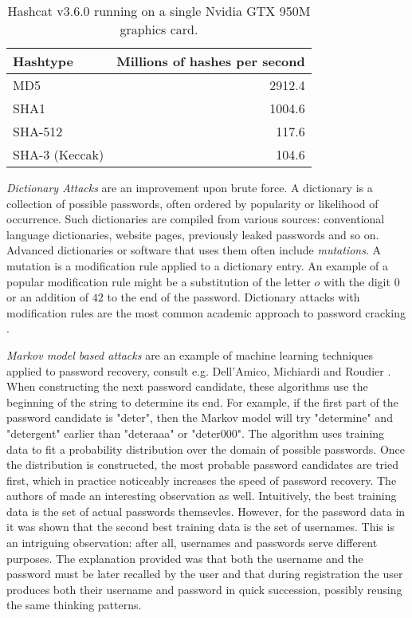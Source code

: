 \begin{table}
    \begin{center}
        \begin{tabular}{lr}
            Hashtype & Millions of hashes per second \\
            \hline
            MD5 & 2912.4 \\
            SHA1 & 1004.6 \\
            SHA-512 & 117.6 \\
            SHA-3 (Keccak) & 104.6
        \end{tabular}
    \end{center}
    \caption{Hashcat v3.6.0 running on a single Nvidia GTX 950M graphics card.}
    \label{table:hashcat-speed}
\end{table}

\emph{Dictionary Attacks} are an improvement upon brute force. A dictionary is a collection of possible passwords, often ordered by popularity or likelihood of occurrence. Such dictionaries are compiled from various sources: conventional language dictionaries, website pages, previously leaked passwords and so on. Advanced dictionaries or software that uses them often include \emph{mutations}. A mutation is a modification rule applied to a dictionary entry. An example of a popular modification rule might be a substitution of the letter \(o\) with the digit \(0\) or an addition of \(42\) to the end of the password. Dictionary attacks with modification rules are the most common academic approach to password cracking \cite{zhang2010security, weir2010testing, kelley2012guess, shay2010encountering}.

\emph{Markov model based attacks} are an example of machine learning techniques applied to password recovery, consult e.g. Dell’Amico, Michiardi and Roudier \cite{dell:2010:password}. When constructing the next password candidate, these algorithms use the beginning of the string to determine its end. For example, if the first part of the password candidate is "deter", then the Markov model will try "determine" and "detergent" earlier than "deteraaa" or "deter000". The algorithm uses training data to fit a probability distribution over the domain of possible passwords. Once the distribution is constructed, the most probable password candidates are tried first, which in practice noticeably increases the speed of password recovery. The authors of \cite{dell:2010:password} made an interesting observation as well. Intuitively, the best training data is the set of actual passwords themsevles. However, for the password data in \cite{dell:2010:password} it was shown that the second best training data is the set of usernames. This is an intriguing observation: after all, usernames and passwords serve different purposes. The explanation provided was that both the username and the password must be later recalled by the user and that during registration the user produces both their username and password in quick succession, possibly reusing the same thinking patterns.

